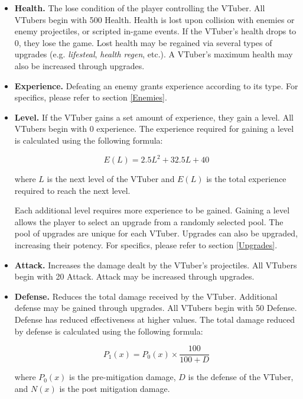 \documentclass[10pt, a4paper]{article}
\begin{document}
  	
  	\begin{itemize}
  	\item \textbf{Health.} The lose condition of the player controlling the VTuber. All VTubers begin with 500 Health. Health is lost upon collision with enemies or enemy projectiles, or scripted in-game events. If the VTuber's health drops to 0, they lose the game. Lost health may be regained via several types of upgrades (e.g. \textit{lifesteal}, \textit{health regen}, etc.). A VTuber's maximum health may also be increased through upgrades.

  	\item \textbf{Experience.} Defeating an enemy grants experience according to its type. For specifics, please refer to section \ref{Enemies}. 
  	
  	\item \textbf{Level.} If the VTuber gains a set amount of experience, they gain a level. All VTubers begin with 0 experience. The experience required for gaining a level is calculated using the following formula:
  	
  	\[E(L) = 2.5L^2 + 32.5L + 40\]
  	
  	where $L$ is the next level of the VTuber and $E(L)$ is the total experience required to reach the next level.
  	
  	Each additional level requires more experience to be gained. Gaining a level allows the player to select an upgrade from a randomly selected pool. The pool of upgrades are unique for each VTuber. Upgrades can also be upgraded, increasing their potency. For specifics, please refer to section \ref{Upgrades}.
  	
  	\item \textbf{Attack.} Increases the damage dealt by the VTuber's projectiles. All VTubers begin with 20 Attack. Attack may be increased through upgrades.

  	\item\textbf{Defense.} Reduces the total damage received by the VTuber. Additional defense may be gained through upgrades. All VTubers begin with 50 Defense. Defense has reduced effectiveness at higher values. The total damage reduced by defense is calculated using the following formula:
  	
  	\[P_1(x) = P_0(x) \times \frac{100}{100+D}\]
  	
  	where $P_0(x)$ is the pre-mitigation damage, $D$ is the defense of the VTuber, and $N(x)$ is the post mitigation damage.
  	
  	\end{itemize}
  	
\end{document}
